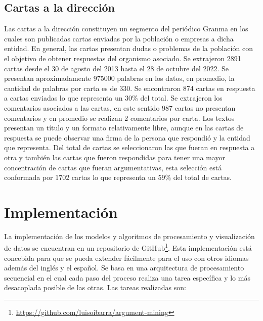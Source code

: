 \subsection{Cartas a la dirección}

Las cartas a la dirección constituyen un segmento del periódico Granma en los cuales son publicadas
cartas enviadas por la población o empresas a dicha entidad. En general, las cartas 
presentan dudas o problemas de la población con el objetivo de obtener respuestas del organismo
asociado. Se extrajeron 2891 cartas desde el 30 de agosto del 2013 hasta el 28 de octubre del 2022. Se 
presentan aproximadamente 975000 palabras en los datos, en promedio, la cantidad de palabras por carta es de 330.
Se encontraron 874 cartas en respuesta a cartas enviadas lo que representa un 30\% del total. Se extrajeron
los comentarios asociados a las cartas, en este sentido 987 cartas no presentan comentarios y en promedio 
se realizan 2 comentarios por carta. Los textos presentan un título y un formato relativamente libre, 
aunque en las cartas de respuesta se puede observar una firma de la persona que respondió y la entidad que 
representa. Del total de cartas se seleccionaron las que fueran en respuesta a otra y también las 
cartas que fueron respondidas para tener una mayor concentración de cartas que fueran argumentativas, 
esta selección está conformada por 1702 cartas lo que representa un 59\% del total de cartas.

\section{Implementación}

La implementación de los modelos y algoritmos de procesamiento y visualización de datos se encuentran en 
un repositorio de GitHub\footnote{\url{https://github.com/luisoibarra/argument-mining}}. Esta implementación
está concebida para que se pueda extender fácilmente para el uso con otros idiomas además del inglés y el 
español. Se basa en una arquitectura de procesamiento secuencial en el cual cada paso del proceso realiza
una tarea específica y lo más desacoplada posible de las otras. Las tareas realizadas son:

